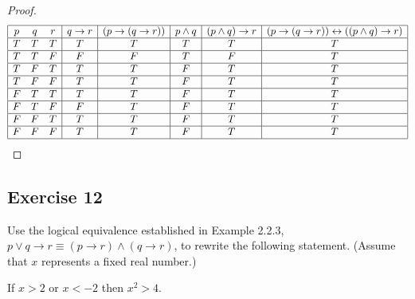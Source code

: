 \documentclass[14pt]{extarticle}
\newcommand{\bic}{\leftrightarrow}
\begin{document}
\begin{proof}
    $$
        \begin{array}{|ccc|c|c|c|c|c|}
            \hline
            p & q & r & q \to r & (p \to (q \to r)) & p \wedge q & (p \wedge q) \to r & (p \to (q \to r)) \bic ((p \wedge q) \to r) \\
            \hline
            T & T & T & T       & T                 & T          & T                  & T                                           \\
            \hline
            T & T & F & F       & F                 & T          & F                  & T                                           \\
            \hline
            T & F & T & T       & T                 & F          & T                  & T                                           \\
            \hline
            T & F & F & T       & T                 & F          & T                  & T                                           \\
            \hline
            F & T & T & T       & T                 & F          & T                  & T                                           \\
            \hline
            F & T & F & F       & T                 & F          & T                  & T                                           \\
            \hline
            F & F & T & T       & T                 & F          & T                  & T                                           \\
            \hline
            F & F & F & T       & T                 & F          & T                  & T                                           \\
            \hline
        \end{array}
    $$
\end{proof}

\subsection{Exercise 12}
Use the logical equivalence established in Example 2.2.3, $p \vee q \to r \equiv (p \to r) \wedge (q \to r)$, to rewrite the
following statement. (Assume that $x$ represents a fixed real number.)
\begin{center}
    If $x > 2$ or $x < -2$ then $x^2 > 4$.
\end{center}
\end{document}
